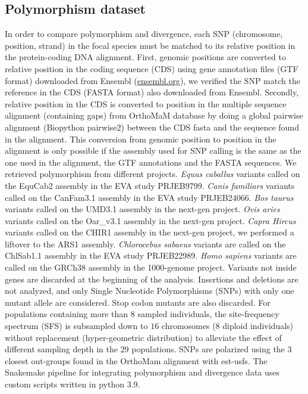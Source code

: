 \documentclass{article}
\begin{document}
    \subsection{Polymorphism dataset}
    \label{subsec:polymorphism-dataset}

    In order to compare polymorphism and divergence, each SNP (chromosome, position, strand) in the focal species must be matched to its relative position in the protein-coding DNA alignment.
    First, genomic positions are converted to relative position in the coding sequence (CDS) using gene annotation files (GTF format) downloaded from Ensembl (\url{ensembl.org}), we verified the SNP match the reference in the CDS (FASTA format) also downloaded from Ensembl.
    Secondly, relative position in the CDS is converted to position in the multiple sequence alignment (containing gaps) from OrthoMaM database\cite{ranwez_orthomam_2007, douzery_orthomam_2014, scornavacca_orthomam_2019} by doing a global pairwise alignment (Biopython pairwise2) between the CDS fasta and the sequence found in the alignment.
    This conversion from genomic position to position in the alignment is only possible if the assembly used for SNP calling is the same as the one used in the alignment, the GTF annotations and the FASTA sequences.
    We retrieved polymorphism from different projects.
    \textit{Equus caballus} variants called on the EquCab2 assembly in the EVA study PRJEB9799.
    \textit{Canis familiars} variants called on the CanFam3.1 assembly in the EVA study PRJEB24066.
    \textit{Bos taurus} variants called on the UMD3.1 assembly in the next-gen project.
    \textit{Ovis aries} variants called on the Oar\_v3.1 assembly in the next-gen project.
    \textit{Capra Hircus} variants called on the CHIR1 assembly in the next-gen project, we performed a liftover to the ARS1 assembly.
    \textit{Chlorocebus sabaeus} variants are called on the ChlSab1.1 assembly in the EVA study PRJEB22989\cite{svardal_ancient_2017}.
    \textit{Homo sapiens} variants are called on the GRCh38 assembly in the 1000-genome project\cite{consortium_integrated_2012, the1000genomesprojectconsortium_global_2015}.
    Variants not inside genes are discarded at the beginning of the analysis.
    Insertions and deletions are not analyzed, and only Single Nucleotide Polymorphisms (SNPs) with only one mutant allele are considered.
    Stop codon mutants are also discarded.
    For populations containing more than $8$ sampled individuals, the site-frequency spectrum (SFS) is subsampled down to $16$ chromosomes ($8$ diploid individuals) without replacement (hyper-geometric distribution) to alleviate the effect of different sampling depth in the $29$ populations.
    SNPs are polarized using the $3$ closest out-groups found in the OrthoMam alignment with est-usfs\cite{keightley_inferring_2018}.
    The Snakemake pipeline for integrating polymorphism and divergence data uses custom scripts written in python 3.9.
\end{document}
